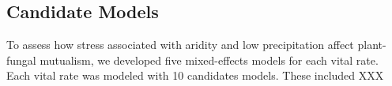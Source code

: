 \documentclass[11pt]{article}
\begin{document}
%
%

\subsection*{Candidate Models}
To assess how stress associated with aridity and low precipitation affect plant-fungal mutualism, we developed five mixed-effects models for each vital rate. 
Each vital rate was modeled with 10 candidates models. 
These included XXX
\end{document}
